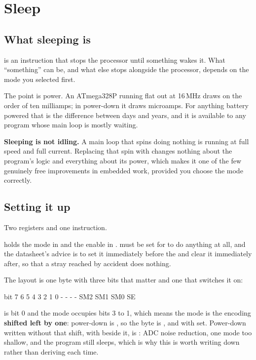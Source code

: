 
\section{Sleep}
\label{c6:sec:sleep}

\subsection{What sleeping is}
\label{c6:sec:sleeping}
 is an instruction that stops the processor until something wakes it. What
``something'' can be, and what else stops alongside the processor, depends on the mode you
selected first.

The point is power. An ATmega328P running flat out at 16\,MHz draws on the order of ten
milliamps; in power-down it draws microamps. For anything battery powered that is the difference
between days and years, and it is available to any program whose main loop is mostly waiting.

\textbf{Sleeping is not idling.} A main loop that spins doing nothing is running at full speed and
full current. Replacing that spin with  changes nothing about the program's logic and
everything about its power, which makes it one of the few genuinely free improvements in embedded
work, provided you choose the mode correctly.

\subsection{Setting it up}
\label{c6:sec:smcr}
Two registers and one instruction.

 holds the mode in  and the enable in .  must be set for
 to do anything at all, and the datasheet's advice is to set it immediately before the
 and clear it immediately after, so that a stray  reached by accident does
nothing.

The layout is one byte with three bits that matter and one that switches it on:

\begin{console}
    bit    7   6   5   4   3   2   1   0
           -   -   -   -  SM2 SM1 SM0  SE
\end{console}

 is bit 0 and the mode occupies bits 3 to 1, which means the mode is the encoding
\textbf{shifted left by one}: power-down is , so the byte is , and
 with  set. Power-down written without that shift,  with 
beside it, is : ADC noise reduction, one mode too shallow, and the program still sleeps,
which is why this is worth writing down rather than deriving each time.


